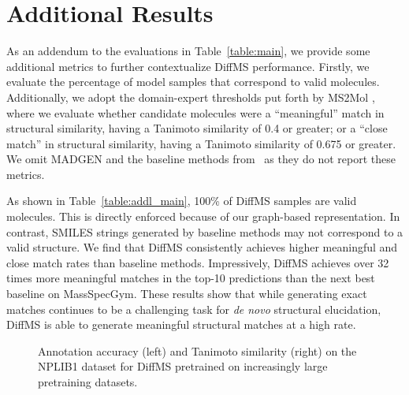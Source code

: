 \documentclass{article}
\theoremstyle{plain}
\theoremstyle{definition}
\theoremstyle{remark}
\newcommand{\ours}{DiffMS\xspace}
\begin{document}
\section{Additional Results} \label{appendix:eval}
As an addendum to the evaluations in Table~\ref{table:main}, we provide some additional metrics to further contextualize DiffMS performance. Firstly, we evaluate the percentage of model samples that correspond to valid molecules. Additionally, we adopt the domain-expert thresholds put forth by MS2Mol \citep{butler2023ms2mol}, where we evaluate whether candidate molecules were a ``meaningful'' match in structural similarity, having a Tanimoto similarity of 0.4 or greater; or a ``close match'' in structural similarity, having a Tanimoto similarity of 0.675 or greater. We omit MADGEN and the baseline methods from~\citet{bushuiev2024massspecgymbenchmarkdiscoveryidentification} as they do not report these metrics.

As shown in Table~\ref{table:addl_main}, 100\% of DiffMS samples are valid molecules. This is directly enforced because of our graph-based representation. In contrast, SMILES strings generated by baseline methods may not correspond to a valid structure. We find that DiffMS consistently achieves higher meaningful and close match rates than baseline methods. Impressively, DiffMS achieves over 32 times more meaningful matches in the top-10 predictions than the next best baseline on MassSpecGym. These results show that while generating exact matches continues to be a challenging task for \textit{de novo} structural elucidation, DiffMS is able to generate meaningful structural matches at a high rate.

\begin{figure}[t]
\centering
{}
\vspace{-0.1in}
\caption{Annotation accuracy (left) and Tanimoto similarity (right) on the NPLIB1 dataset for \ours pretrained on increasingly large pretraining datasets.}
\label{figure:appendix_ablate_encoder}
\vspace{-0.2in}
\end{figure}
\end{document}
